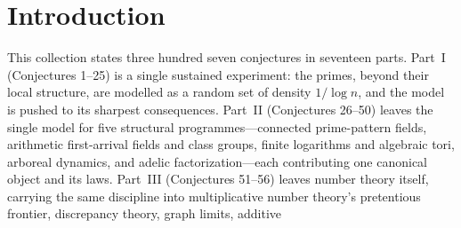 \documentclass[11pt]{article}
\theoremstyle{definition}
\begin{document}
\tableofcontents

\section{Introduction}

This collection states three hundred seven conjectures in seventeen parts.  Part~I
(Conjectures 1--25) is a single sustained experiment: the primes, beyond
their local structure, are modelled as a random set of density
$1/\log n$, and the model is pushed to its sharpest consequences.
Part~II (Conjectures 26--50) leaves the single model for five structural
programmes---connected prime-pattern fields, arithmetic first-arrival
fields and class groups, finite logarithms and algebraic tori, arboreal
dynamics, and adelic factorization---each contributing one canonical
object and its laws.  Part~III (Conjectures 51--56) leaves number theory
itself, carrying the same discipline into multiplicative number theory's
pretentious frontier, discrepancy theory, graph limits, additive
\end{document}
